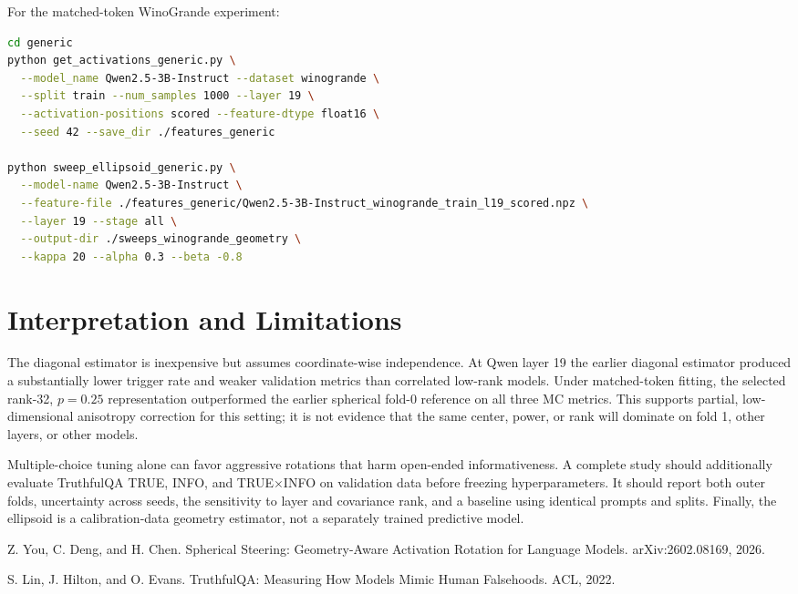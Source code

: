 \documentclass[11pt]{article}
\begin{document}
For the matched-token WinoGrande experiment:

\begin{lstlisting}[language=bash]
cd generic
python get_activations_generic.py \
  --model_name Qwen2.5-3B-Instruct --dataset winogrande \
  --split train --num_samples 1000 --layer 19 \
  --activation-positions scored --feature-dtype float16 \
  --seed 42 --save_dir ./features_generic

python sweep_ellipsoid_generic.py \
  --model-name Qwen2.5-3B-Instruct \
  --feature-file ./features_generic/Qwen2.5-3B-Instruct_winogrande_train_l19_scored.npz \
  --layer 19 --stage all \
  --output-dir ./sweeps_winogrande_geometry \
  --kappa 20 --alpha 0.3 --beta -0.8
\end{lstlisting}

\section{Interpretation and Limitations}

The diagonal estimator is inexpensive but assumes coordinate-wise independence.
At Qwen layer 19 the earlier diagonal estimator produced a substantially lower
trigger rate and weaker validation metrics than correlated low-rank models.
Under matched-token fitting, the selected rank-32, $p=0.25$ representation
outperformed the earlier spherical fold-0 reference on all three MC metrics.
This supports partial, low-dimensional anisotropy correction for this setting;
it is not evidence that the same center, power, or rank will dominate on fold
1, other layers, or other models.

Multiple-choice tuning alone can favor aggressive rotations that harm
open-ended informativeness.  A complete study should additionally evaluate
TruthfulQA TRUE, INFO, and TRUE$\times$INFO on validation data before freezing
hyperparameters.  It should report both outer folds, uncertainty across seeds,
the sensitivity to layer and covariance rank, and a baseline using identical
prompts and splits.  Finally, the ellipsoid is a calibration-data geometry
estimator, not a separately trained predictive model.

\begin{thebibliography}{9}
\bibitem{spherical}
Z. You, C. Deng, and H. Chen.
\newblock Spherical Steering: Geometry-Aware Activation Rotation for Language Models.
\newblock arXiv:2602.08169, 2026.

\bibitem{truthfulqa}
S. Lin, J. Hilton, and O. Evans.
\newblock TruthfulQA: Measuring How Models Mimic Human Falsehoods.
\newblock ACL, 2022.
\end{thebibliography}
\end{document}
